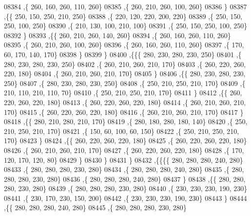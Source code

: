 \begin{DoxyCode}
08384     ,\{   260,   160,   260,   110,   260\}
08385     ,\{   260,   210,   260,   100,   260\}
08386     \}
08387    ,\{\{   250,   150,   250,   210,   250\}
08388     ,\{   220,   120,   220,   200,   220\}
08389     ,\{   250,   150,   250,   100,   250\}
08390     ,\{   210,   130,   100,   210,   100\}
08391     ,\{   250,   150,   250,   100,   250\}
08392     \}
08393    ,\{\{   260,   210,   260,   140,   260\}
08394     ,\{   260,   160,   260,   110,   260\}
08395     ,\{   260,   210,   260,   100,   260\}
08396     ,\{   260,   160,   260,   110,   260\}
08397     ,\{   170,    60,   170,   140,   170\}
08398     \}
08399    \}
08400   ,\{\{\{   280,   230,   280,   230,   250\}
08401     ,\{   280,   230,   280,   230,   250\}
08402     ,\{   260,   210,   260,   210,   170\}
08403     ,\{   260,   220,   260,   220,   180\}
08404     ,\{   260,   210,   260,   210,   170\}
08405     \}
08406    ,\{\{   280,   230,   280,   230,   250\}
08407     ,\{   280,   230,   280,   230,   250\}
08408     ,\{   250,   210,   250,   210,   170\}
08409     ,\{   210,   110,   210,   110,    70\}
08410     ,\{   250,   210,   250,   210,   170\}
08411     \}
08412    ,\{\{   260,   220,   260,   220,   180\}
08413     ,\{   260,   220,   260,   220,   180\}
08414     ,\{   260,   210,   260,   210,   170\}
08415     ,\{   260,   220,   260,   220,   180\}
08416     ,\{   260,   210,   260,   210,   170\}
08417     \}
08418    ,\{\{   280,   210,   280,   210,   170\}
08419     ,\{   280,   180,   280,   180,   140\}
08420     ,\{   250,   210,   250,   210,   170\}
08421     ,\{   150,    60,   100,    60,   150\}
08422     ,\{   250,   210,   250,   210,   170\}
08423     \}
08424    ,\{\{   260,   220,   260,   220,   180\}
08425     ,\{   260,   220,   260,   220,   180\}
08426     ,\{   260,   210,   260,   210,   170\}
08427     ,\{   260,   220,   260,   220,   180\}
08428     ,\{   170,   120,   170,   120,    80\}
08429     \}
08430    \}
08431   \}
08432  ,\{\{\{\{   280,   280,   280,   240,   280\}
08433     ,\{   280,   280,   280,   230,   280\}
08434     ,\{   280,   280,   280,   240,   280\}
08435     ,\{   280,   280,   280,   230,   280\}
08436     ,\{   280,   280,   280,   240,   280\}
08437     \}
08438    ,\{\{   280,   280,   280,   230,   280\}
08439     ,\{   280,   280,   280,   230,   280\}
08440     ,\{   230,   230,   230,   190,   230\}
08441     ,\{   230,   170,   230,   150,   200\}
08442     ,\{   230,   230,   230,   190,   230\}
08443     \}
08444    ,\{\{   280,   280,   280,   240,   280\}
08445     ,\{   280,   280,   280,   230,   280\}

\end{DoxyCode}
